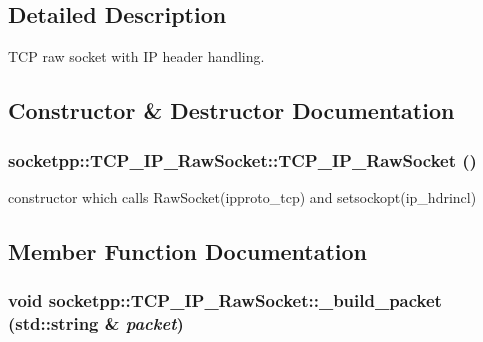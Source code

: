\subsection{Detailed Description}
TCP raw socket with IP header handling. 

\subsection{Constructor \& Destructor Documentation}
\hypertarget{classsocketpp_1_1TCP__IP__RawSocket_1b08f12274fd9590f805bc876c44edd9}{
\subsubsection[{TCP\_\-IP\_\-RawSocket}]{\setlength{\rightskip}{0pt plus 5cm}socketpp::TCP\_\-IP\_\-RawSocket::TCP\_\-IP\_\-RawSocket ()}}
\label{classsocketpp_1_1TCP__IP__RawSocket_1b08f12274fd9590f805bc876c44edd9}


constructor which calls RawSocket(ipproto\_\-tcp) and setsockopt(ip\_\-hdrincl) 



\subsection{Member Function Documentation}
\hypertarget{classsocketpp_1_1TCP__IP__RawSocket_281508237add8a3c530bb0be0b6a1e7b}{
\subsubsection[{\_\-build\_\-packet}]{\setlength{\rightskip}{0pt plus 5cm}void socketpp::TCP\_\-IP\_\-RawSocket::\_\-build\_\-packet (std::string \& {\em packet})}}
\label{classsocketpp_1_1TCP__IP__RawSocket_281508237add8a3c530bb0be0b6a1e7b}




